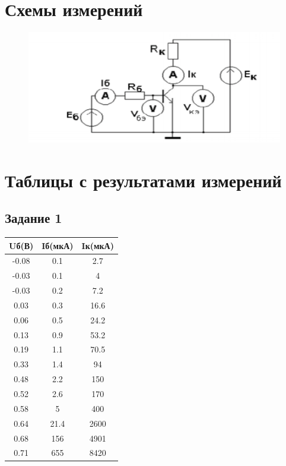 \documentclass[a4paper,14pt]{article}
\begin{document}
\pagebreak

\section{Схемы измерений}
\begin{figure}[H]
	\centering
	\includegraphics[width=0.7\linewidth]{images/shema}
	\caption{}
	\label{fig:shema}
\end{figure}

\section{Таблицы с результатами измерений}
\subsection{ Задание 1}
\begin{table}[H]
	\begin{tabular}{|c|c|c|}
		\hline
		Uб(В) & Iб(мкА) & Iк(мкА) \\ \hline
		-0.08 & 0.1     & 2.7     \\ \hline
		-0.03 & 0.1     & 4       \\ \hline
		-0.03 & 0.2     & 7.2     \\ \hline
		0.03  & 0.3     & 16.6    \\ \hline
		0.06  & 0.5     & 24.2    \\ \hline
		0.13  & 0.9     & 53.2    \\ \hline
		0.19  & 1.1     & 70.5    \\ \hline
		0.33  & 1.4     & 94      \\ \hline
		0.48  & 2.2     & 150     \\ \hline
		0.52  & 2.6     & 170     \\ \hline
		0.58  & 5       & 400     \\ \hline
		0.64  & 21.4    & 2600    \\ \hline
		0.68  & 156     & 4901    \\ \hline
		0.71  & 655     & 8420    \\ \hline
	\end{tabular}
\end{table}
\end{document}
